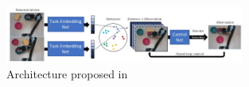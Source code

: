 \begin{figure}[htb]
    \centering
    \includegraphics[width=0.7\textwidth]{Figures/images/task_embedded/task_embedded.png}
    \caption{Architecture proposed in \cite{james2018task_embedded}}
    \label{fig:task_embedded}
\end{figure}
